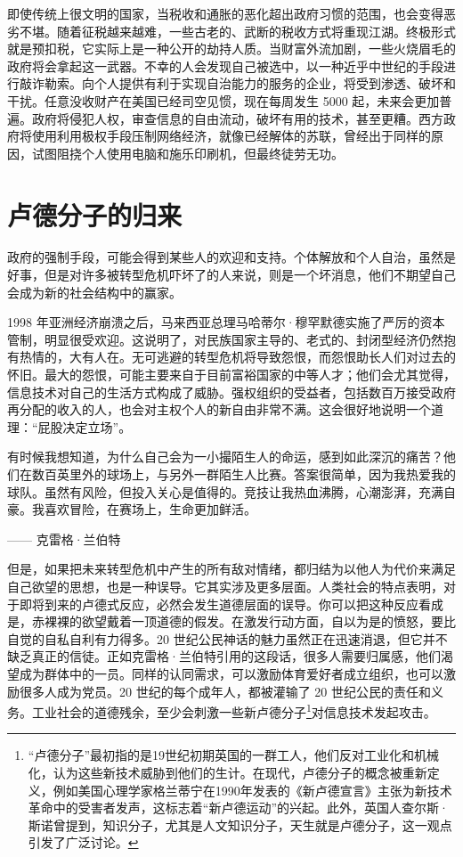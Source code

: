 即使传统上很文明的国家，当税收和通胀的恶化超出政府习惯的范围，也会变得恶劣不堪。随着征税越来越难，一些古老的、武断的税收方式将重现江湖。终极形式就是预扣税，它实际上是一种公开的劫持人质。当财富外流加剧，一些火烧眉毛的政府将会拿起这一武器。不幸的人会发现自己被选中，以一种近乎中世纪的手段进行敲诈勒索。向个人提供有利于实现自治能力的服务的企业，将受到渗透、破坏和干扰。任意没收财产在美国已经司空见惯，现在每周发生 5000 起，未来会更加普遍。政府将侵犯人权，审查信息的自由流动，破坏有用的技术，甚至更糟。西方政府将使用利用极权手段压制网络经济，就像已经解体的苏联，曾经出于同样的原因，试图阻挠个人使用电脑和施乐印刷机，但最终徒劳无功。



\section{卢德分子的归来}

政府的强制手段，可能会得到某些人的欢迎和支持。个体解放和个人自治，虽然是好事，但是对许多被转型危机吓坏了的人来说，则是一个坏消息，他们不期望自己会成为新的社会结构中的赢家。


1998 年亚洲经济崩溃之后，马来西亚总理马哈蒂尔·穆罕默德实施了严厉的资本管制，明显很受欢迎。这说明了，对民族国家主导的、老式的、封闭型经济仍然抱有热情的，大有人在。无可逃避的转型危机将导致怨恨，而怨恨助长人们对过去的怀旧。最大的怨恨，可能主要来自于目前富裕国家的中等人才；他们会尤其觉得，信息技术对自己的生活方式构成了威胁。强权组织的受益者，包括数百万接受政府再分配的收入的人，也会对主权个人的新自由非常不满。这会很好地说明一个道理：“屁股决定立场”。


\begin{tcolorbox}
有时候我想知道，为什么自己会为一小撮陌生人的命运，感到如此深沉的痛苦？他们在数百英里外的球场上，与另外一群陌生人比赛。答案很简单，因为我热爱我的球队。虽然有风险，但投入关心是值得的。竞技让我热血沸腾，心潮澎湃，充满自豪。我喜欢冒险，在赛场上，生命更加鲜活。
\begin{flushright}
—— 克雷格·兰伯特
\end{flushright}
\end{tcolorbox}

但是，如果把未来转型危机中产生的所有敌对情绪，都归结为以他人为代价来满足自己欲望的思想，也是一种误导。它其实涉及更多层面。人类社会的特点表明，对于即将到来的卢德式反应，必然会发生道德层面的误导。你可以把这种反应看成是，赤裸裸的欲望戴着一顶道德的假发。在激发行动方面，自以为是的愤怒，要比自觉的自私自利有力得多。20 世纪公民神话的魅力虽然正在迅速消退，但它并不缺乏真正的信徒。正如克雷格·兰伯特引用的这段话，很多人需要归属感，他们渴望成为群体中的一员。同样的认同需求，可以激励体育爱好者成立组织，也可以激励很多人成为党员。20 世纪的每个成年人，都被灌输了 20 世纪公民的责任和义务。工业社会的道德残余，至少会刺激一些新卢德分子\footnote{“卢德分子”最初指的是19世纪初期英国的一群工人，他们反对工业化和机械化，认为这些新技术威胁到他们的生计。在现代，卢德分子的概念被重新定义，例如美国心理学家格兰蒂宁在1990年发表的《新卢德宣言》主张为新技术革命中的受害者发声，这标志着“新卢德运动”的兴起。此外，英国人查尔斯·斯诺曾提到，知识分子，尤其是人文知识分子，天生就是卢德分子，这一观点引发了广泛讨论。}对信息技术发起攻击。


